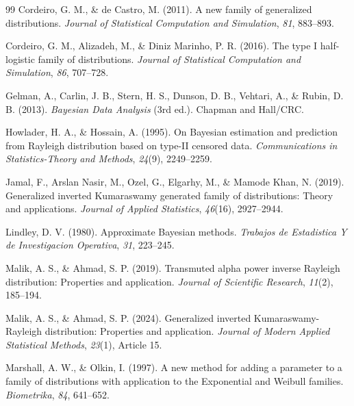\documentclass[12pt]{article}
\begin{document}
\begin{thebibliography}{99}
Cordeiro, G. M., \& de Castro, M. (2011).
A new family of generalized distributions.
\emph{Journal of Statistical Computation and Simulation}, \emph{81}, 883--893.



Cordeiro, G. M., Alizadeh, M., \& Diniz Marinho, P. R. (2016).
The type I half-logistic family of distributions.
\emph{Journal of Statistical Computation and Simulation}, \emph{86}, 707--728.



Gelman, A., Carlin, J. B., Stern, H. S., Dunson, D. B., Vehtari, A., \& Rubin, D. B. (2013).
\emph{Bayesian Data Analysis} (3rd ed.).
Chapman and Hall/CRC.



Howlader, H. A., \& Hossain, A. (1995).
On Bayesian estimation and prediction from Rayleigh distribution based on type-II censored data.
\emph{Communications in Statistics-Theory and Methods}, \emph{24}(9), 2249--2259.



Jamal, F., Arslan Nasir, M., Ozel, G., Elgarhy, M., \& Mamode Khan, N. (2019).
Generalized inverted Kumaraswamy generated family of distributions: Theory and applications.
\emph{Journal of Applied Statistics}, \emph{46}(16), 2927--2944.



Lindley, D. V. (1980).
Approximate Bayesian methods.
\emph{Trabajos de Estadistica Y de Investigacion Operativa}, \emph{31}, 223--245.



Malik, A. S., \& Ahmad, S. P. (2019).
Transmuted alpha power inverse Rayleigh distribution: Properties and application.
\emph{Journal of Scientific Research}, \emph{11}(2), 185--194.



Malik, A. S., \& Ahmad, S. P. (2024).
Generalized inverted Kumaraswamy-Rayleigh distribution: Properties and application.
\emph{Journal of Modern Applied Statistical Methods}, \emph{23}(1), Article 15.



Marshall, A. W., \& Olkin, I. (1997).
A new method for adding a parameter to a family of distributions with application to the Exponential and Weibull families.
\emph{Biometrika}, \emph{84}, 641--652.




\end{thebibliography}
\end{document}
